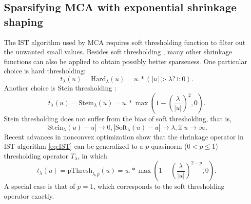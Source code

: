 \subsection{Sparsifying MCA with exponential shrinkage shaping}

The IST algorithm used by MCA requires soft thresholding function to filter out the unwanted small values. Besides soft thresholding \citep{donoho1995noising}, many other shrinkage functions can also be applied to obtain possibly better sparseness. One particular choice is hard thresholding:
\begin{equation}
t_{\lambda}(u)=\mathrm{Hard}_{\lambda}(u)=u.*(|u|>\lambda?1:0).
\end{equation}
Another choice is Stein thresholding \citep{peyre2010advanced}:
\begin{equation}\label{eq:stein}
t_{\lambda}(u)=\mathrm{Stein}_{\lambda}(u)=u.*\max\left(1-(\frac{\lambda}{|u|})^{2},0\right).
\end{equation}
Stein thresholding does not suffer from the bias of soft thresholding, that is,
\begin{equation}
|\mathrm{Stein}_{\lambda}(u)-u| \rightarrow 0, |\mathrm{Soft}_{\lambda}(u)-u|\rightarrow \lambda,
\mathrm{if}\; u\rightarrow\infty.
\end{equation}
Recent advances in nonconvex optimization \citep{chartrand2012,chartrand2013generalized,chartrand2013nonconvex} show that the shrinkage operator in IST algorithm \eqref{eq:IST} can be generalized to a $p$-quasinorm ($0<p\leq1$) thresholding operator $T_{\lambda}$, in which
\begin{equation}\label{eq:pthresh}
t_{\lambda}(u)=\mathrm{pThresh}_{\lambda,p}(u)=u.*\max\left(1-(\frac{\lambda}{|u|})^{2-p},0\right).
\end{equation}
A special case is that of $p=1$, which corresponds to the soft thresholding operator exactly.



